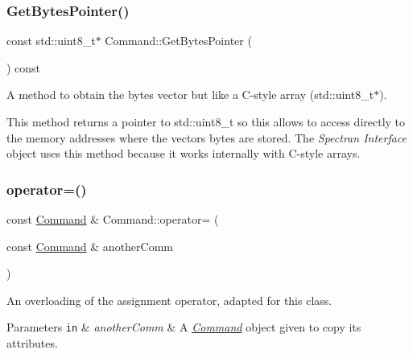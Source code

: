 \subsubsection{\texorpdfstring{Get\+Bytes\+Pointer()}{GetBytesPointer()}}
{\footnotesize\ttfamily const std\+::uint8\+\_\+t$\ast$ Command\+::\+Get\+Bytes\+Pointer (\begin{DoxyParamCaption}{ }\end{DoxyParamCaption}) const\hspace{0.3cm}{\ttfamily [inline]}}



A method to obtain the bytes vector but like a C-\/style array ({\ttfamily std\+::uint8\+\_\+t$\ast$}). 

This method returns a pointer to {\ttfamily std\+::uint8\+\_\+t} so this allows to access directly to the memory addresses where the vector\textquotesingle{}s bytes are stored. The {\itshape Spectran Interface} object uses this method because it works internally with C-\/style arrays. \mbox{\label{classCommand_ac3345fe77bca04644aaddcf2de835f34}} 
\subsubsection{\texorpdfstring{operator=()}{operator=()}}
{\footnotesize\ttfamily const \hyperlink{classCommand}{Command} \& Command\+::operator= (\begin{DoxyParamCaption}\item[{const \hyperlink{classCommand}{Command} \&}]{another\+Comm }\end{DoxyParamCaption})}



An overloading of the assignment operator, adapted for this class. 


\begin{DoxyParams}[1]{Parameters}
\mbox{\tt in}  & {\em another\+Comm} & A {\itshape \hyperlink{classCommand}{Command}} object given to copy its attributes. \\
\hline
\end{DoxyParams}
\mbox{\label{classCommand_ab49af30836fbeb1ec43a9814132889c8}} 
